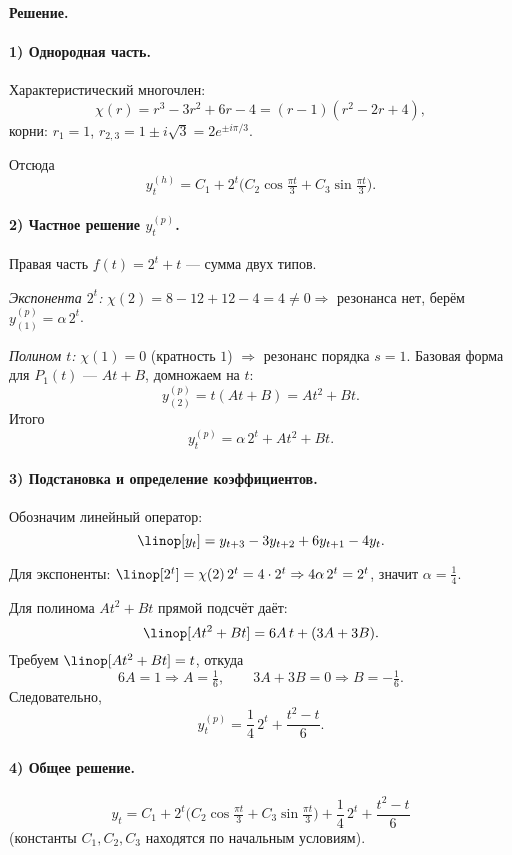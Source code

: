 \bigskip


\bigskip

\textbf{Решение.}

\paragraph{1) Однородная часть.}
Характеристический многочлен:
\[
\chi(r)=r^3-3r^2+6r-4=(r-1)(r^2-2r+4),
\]
корни: $r_1=1$, $r_{2,3}=1\pm i\sqrt{3}=2e^{\pm i\pi/3}$.

Отсюда
\[
y_t^{(h)} = C_1 + 2^t\Big(C_2\cos\tfrac{\pi t}{3} + C_3\sin\tfrac{\pi t}{3}\Big).
\]

\paragraph{2) Частное решение $y_t^{(p)}$.}
Правая часть $f(t) = 2^t + t$ — сумма двух типов.

\textit{Экспонента $2^t$:} $\chi(2) = 8 - 12 + 12 - 4 = 4 \neq 0 \Rightarrow$ резонанса нет, берём $y^{(p)}_{(1)} = \alpha\,2^t$.

\textit{Полином $t$:} $\chi(1) = 0$ (кратность $1$) $\Rightarrow$ резонанс порядка $s=1$. Базовая форма для $P_1(t)$ — $At+B$, домножаем на $t$:
\[
y^{(p)}_{(2)} = t(At+B) = At^2 + Bt.
\]
Итого
\[
y_t^{(p)} = \alpha\,2^t + At^2 + Bt.
\]

\paragraph{3) Подстановка и определение коэффициентов.}
Обозначим линейный оператор:
\[
\linop[y_t] = y_{t+3} - 3y_{t+2} + 6y_{t+1} - 4y_t.
\]

Для экспоненты: $\linop[2^t] = \chi(2)\,2^t = 4\cdot2^t \Rightarrow 4\alpha\,2^t = 2^t$, значит $\alpha = \tfrac{1}{4}$.

Для полинома $At^2 + Bt$ прямой подсчёт даёт:
\[
\linop[At^2 + Bt] = 6A\,t + (3A + 3B).
\]
Требуем $\linop[At^2 + Bt] = t$, откуда
\[
6A = 1 \Rightarrow A = \tfrac{1}{6}, \qquad 3A + 3B = 0 \Rightarrow B = -\tfrac{1}{6}.
\]
Следовательно,
\[
y_t^{(p)} = \frac{1}{4}\,2^t + \frac{t^2 - t}{6}.
\]

\paragraph{4) Общее решение.}
\[
\boxed{
y_t = C_1 + 2^t\Big(C_2\cos\tfrac{\pi t}{3} + C_3\sin\tfrac{\pi t}{3}\Big)
+ \frac{1}{4}\,2^t + \frac{t^2 - t}{6}
}
\]
(константы $C_1, C_2, C_3$ находятся по начальным условиям).
